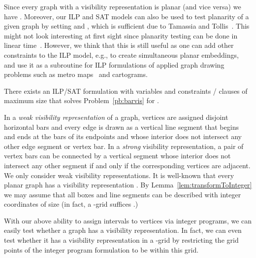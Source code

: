 \documentclass[runningheads]{llncs}
\newcounter{constr}
\begin{document}
Since every graph with a visibility representation is planar (and vice versa) we have . Moreover, our ILP and SAT models can also be used to test planarity of a
given graph by setting  and , which is sufficient due to Tamassia and Tollis~\cite{TT86}. This might not look interesting at first sight since planarity testing can be done in linear time~\cite{planarityTest}. However, we think that this is still useful as one can add other constraints to the ILP model, e.g., 
to create simultaneous planar embeddings, and use it as a subroutine for ILP formulations of applied graph drawing problems
such as metro maps~\cite{nw-dlhqm-11} and cartograms.



\begin{theorem}\label{thm:barvis}
	There exists an ILP/SAT formulation with  variables and
 constraints /  clauses of maximum size  
that solves Problem~\ref{pb:barvis} for . 
\end{theorem}



\iffalse


In a {\em weak visibility representation} of a graph,
vertices are assigned disjoint horizontal bars and
every edge is drawn as a vertical line segment that begins and
ends at the bars of its endpoints and whose interior does not intersect any
other edge segment or vertex bar.
In a {\em strong} visibility representation,
a pair of vertex bars can be connected by a vertical segment
whose interior does not intersect any other segment 
if and only if the corresponding vertices are adjacent.
We only consider weak visibility representations.
It is well-known that every planar graph has a visibility 
representation \cite{Wis85,TT86,RT86}.  
By Lemma~\ref{lem:transformToInteger} we
may assume that all boxes and line segments can be described
with integer coordinates of size  (in fact, a
-grid suffices \cite{TT86}.)

With our above ability to assign intervals to vertices via integer
programs, we can easily test whether a graph has a visibility
representation.  In fact, we can even test whether it has a 
visibility representation in a -grid by restricting
the grid points of the integer program formulation to be within this grid.
\end{document}
